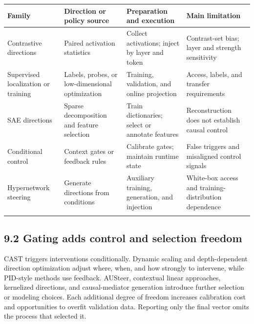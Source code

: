 \begin{longtable}{>{\raggedright\arraybackslash}p{3.53cm}>{\raggedright\arraybackslash}p{3.53cm}>{\raggedright\arraybackslash}p{3.53cm}>{\raggedright\arraybackslash}p{3.53cm}}

\toprule

\textbf{Family} & \textbf{Direction or policy source} & \textbf{Preparation and execution} & \textbf{Main limitation}\\\midrule\endhead

Contrastive directions \cite{r91,r95} & Paired activation statistics & Collect activations; inject by layer and token & Contrast-set bias; layer and strength sensitivity\\\addlinespace[3pt]

Supervised localization or training \cite{r90,r99} & Labels, probes, or low-dimensional optimization & Training, validation, and online projection & Access, labels, and transfer requirements\\\addlinespace[3pt]

SAE directions \cite{r92,r100,r108} & Sparse decomposition and feature selection & Train dictionaries; select or annotate features & Reconstruction does not establish causal control\\\addlinespace[3pt]

Conditional control \cite{r102,r113,r114} & Context gates or feedback rules & Calibrate gates; maintain runtime state & False triggers and misaligned control signals\\\addlinespace[3pt]

Hypernetwork steering \cite{r110} & Generate directions from conditions & Auxiliary training, generation, and injection & White-box access and training-distribution dependence\\\addlinespace[3pt]

\bottomrule\end{longtable}\endgroup

\subsection*{9.2 Gating adds control and selection freedom}

CAST triggers interventions conditionally. Dynamic scaling and depth-dependent direction optimization adjust where, when, and how strongly to intervene, while PID-style methods use feedback.\cite{r102,r113,r114,r115} AUSteer, contextual linear approaches, kernelized directions, and causal-mediator generation introduce further selection or modeling choices.\cite{r118,r121,r122,r128} Each additional degree of freedom increases calibration cost and opportunities to overfit validation data. Reporting only the final vector omits the process that selected it.


